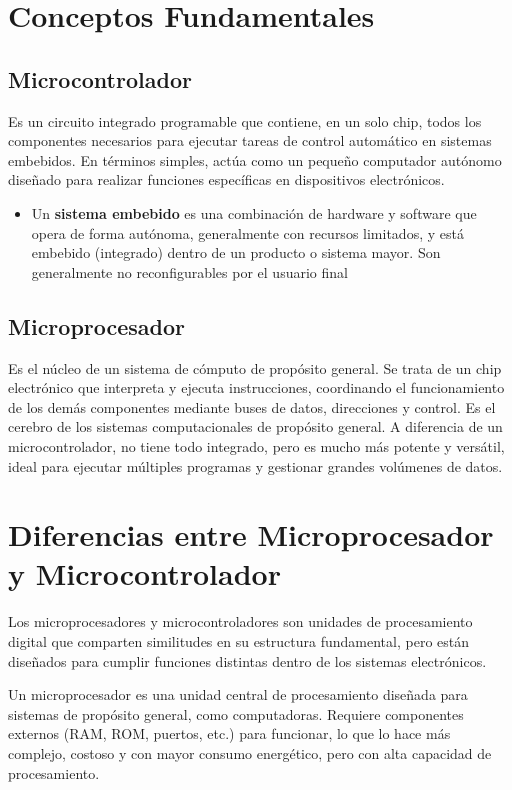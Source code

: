 \documentclass[a4paper,11pt]{article}
\begin{document}
\section{Conceptos Fundamentales}

\subsection{Microcontrolador }
Es un circuito integrado programable que contiene, en un solo chip, todos los componentes necesarios para ejecutar tareas de control automático en sistemas embebidos. En términos simples, actúa como un pequeño computador autónomo diseñado para realizar funciones específicas en dispositivos electrónicos.
\begin{itemize}
  \item Un \textbf {sistema embebido} es una combinación de hardware y software que opera de forma autónoma, generalmente con recursos limitados, y está embebido (integrado) dentro de un producto o sistema mayor. Son generalmente no reconfigurables por el usuario final
  
\end{itemize}

\subsection{Microprocesador}

Es el núcleo de un sistema de cómputo de propósito general. Se trata de un chip electrónico que interpreta y ejecuta instrucciones, coordinando el funcionamiento de los demás componentes mediante buses de datos, direcciones y control.  Es el cerebro de los sistemas computacionales de propósito general. A diferencia de un microcontrolador, no tiene todo integrado, pero es mucho más potente y versátil, ideal para ejecutar múltiples programas y gestionar grandes volúmenes de datos.


\section{Diferencias entre Microprocesador y Microcontrolador}

Los microprocesadores y microcontroladores son unidades de procesamiento digital que comparten similitudes en su estructura fundamental, pero están diseñados para cumplir funciones distintas dentro de los sistemas electrónicos.

\bigskip

Un microprocesador es una unidad central de procesamiento diseñada para sistemas de propósito general, como computadoras. Requiere componentes externos (RAM, ROM, puertos, etc.) para funcionar, lo que lo hace más complejo, costoso y con mayor consumo energético, pero con alta capacidad de procesamiento.
\end{document}

